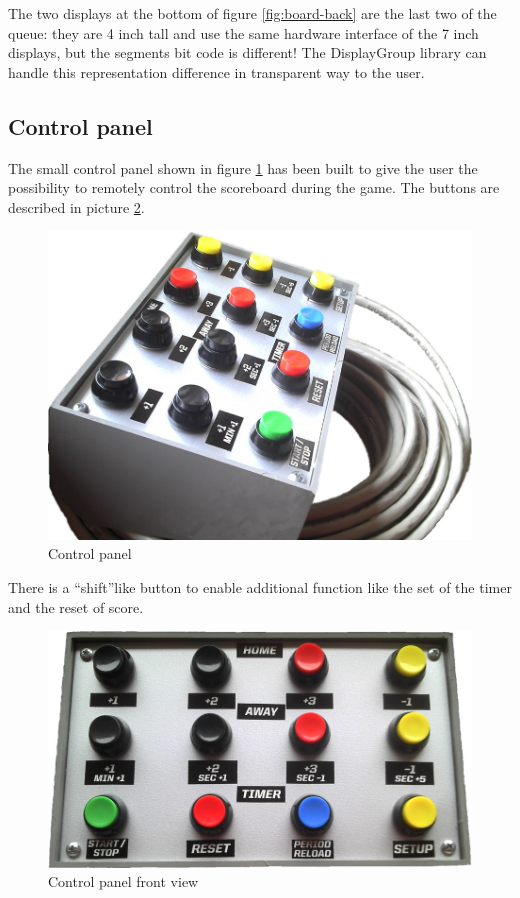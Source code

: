 \documentclass[11pt,english]{article}
\begin{document}
The two displays at the bottom of figure \ref{fig:board-back} are the last two of the queue: they are 4 inch tall 
and use the same hardware interface of the 7 inch displays, but the segments bit code is different!
The DisplayGroup library can handle this representation difference in transparent way to the user.


\subsection{Control panel}\label{subsec:contro-panel}

The small control panel shown in figure \ref{fig:panel} has been built to give the user the possibility 
to remotely control the scoreboard during the game. The buttons are described in picture \ref{fig:panel-schem}.

%
\begin{figure}[htb]
\centering\includegraphics[scale=0.35]{img/Panel}

\caption{Control panel \label{fig:panel}}

\end{figure}

There is a \textquotedblleft shift\textquotedblright like button to enable additional function like the set 
of the timer and the reset of score.

%
\begin{figure}[H]
\centering\includegraphics[scale=0.35]{img/Panel-schem}

\caption{Control panel front view \label{fig:panel-schem}}

\end{figure}
\end{document}
